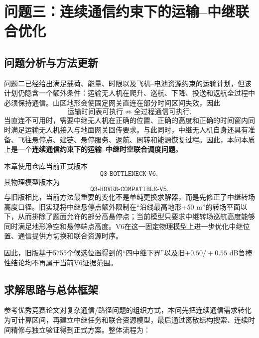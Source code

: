 \documentclass[UTF8,a4paper,12pt]{ctexart}
\begin{document}
\clearpage
\section{问题三：连续通信约束下的运输--中继联合优化}
\label{sec:q3}

\subsection{问题分析与方法更新}

问题二已经给出满足载荷、能量、时限以及飞机--电池资源约束的运输计划，但该计划仍隐含一个额外条件：运输无人机在爬升、巡航、下降、投送和返航全过程中必须保持通信。山区地形会使固定网关直连在部分时间区间失效，因此
\[
\boxed{
\text{运输时间表可执行}
\not\Rightarrow
\text{全过程通信可执行}.
}
\]
当直连不可用时，需要中继无人机在正确的位置、正确的高度和正确的时间窗内同时满足运输无人机接入与地面网关回传要求。与此同时，中继无人机自身还具有准备、飞往悬停点、建链、悬停服务、返航、周转和能源恢复过程。因此，本问本质上是一个\textbf{连续通信约束下的运输--中继时空联合调度问题}。

本章使用仓库当前正式版本
\[
\texttt{Q3-BOTTLENECK-V6},
\]
其物理模型版本为
\[
\texttt{Q3-HOVER-COMPATIBLE-V5}.
\]
与旧版相比，当前方法最重要的变化不是单纯更换求解器，而是先修正了中继转场高度口径。旧实现将中继悬停点额外限制在“沿线最高地形+50 m”的转场平面以下，从而排除了题面允许的部分高悬停点；当前模型只要求中继转场巡航高度能够同时满足地形净空和悬停端点高度。V6在这一固定物理模型上进一步优化中继位置、通信提供方切换和联合资源时序。

因此，旧版基于5755个候选位置得到的“四中继下界”以及旧$+0.50/+0.55$ dB鲁棒性结论均不再属于当前V6证据范围。

\subsection{求解思路与总体框架}

参考优秀竞赛论文对复杂通信/路径问题的组织方式，本问先把连续通信需求转化为可计算区间，再建立中继任务和联合资源模型，最后通过离散结构搜索、连续时间精修与独立验证得到正式方案。整体流程为：
\end{document}
